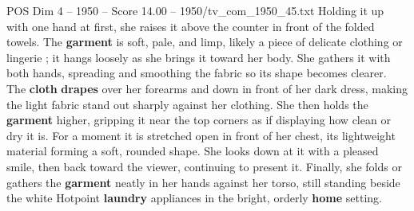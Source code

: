 \begin{textsample}{POS Dim 4 – 1950 – Score 14.00 – 1950/tv\_com\_1950\_45.txt}
Holding it up with one hand at first, she raises it above the counter in front of the folded towels.
The \textbf{garment} is soft, pale, and limp, likely a piece of delicate clothing or lingerie ; it hangs loosely as she brings it toward her body.
She gathers it with both hands, spreading and smoothing the fabric so its shape becomes clearer.
The \textbf{cloth} \textbf{drapes} over her forearms and down in front of her dark dress, making the light fabric stand out sharply against her clothing.
She then holds the \textbf{garment} higher, gripping it near the top corners as if displaying how clean or dry it is.
For a moment it is stretched open in front of her chest, its lightweight material forming a soft, rounded shape.
She looks down at it with a pleased smile, then back toward the viewer, continuing to present it.
Finally, she folds or gathers the \textbf{garment} neatly in her hands against her torso, still standing beside the white Hotpoint \textbf{laundry} appliances in the bright, orderly \textbf{home} setting.

\end{textsample}
